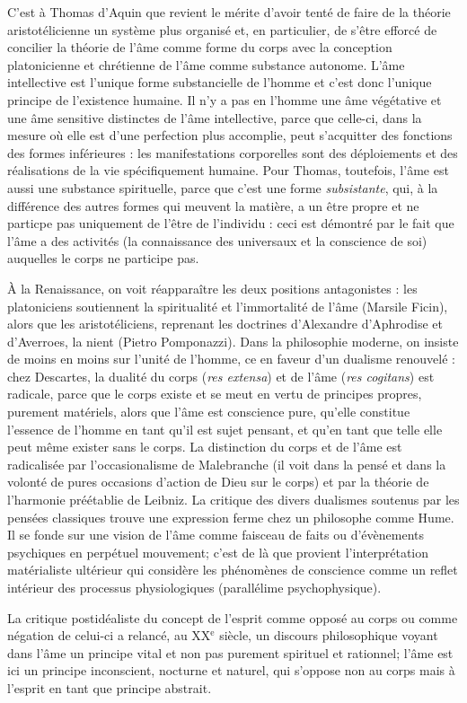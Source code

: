 C'est à Thomas d'Aquin que revient le mérite d'avoir tenté de faire de la théorie aristotélicienne un système plus organisé et, en particulier, de s'être efforcé de concilier la théorie de l'âme comme forme du corps avec la conception platonicienne et chrétienne de l'âme comme substance autonome. L'âme intellective est l'unique forme substancielle de l'homme et c'est donc l'unique principe de l'existence humaine. Il n'y a pas en l'homme une âme végétative et une âme sensitive distinctes de l'âme intellective, parce que celle-ci, dans la mesure où elle est d'une perfection plus accomplie, peut s'acquitter des fonctions des formes inférieures : les manifestations corporelles sont des déploiements et des réalisations de la vie spécifiquement humaine. Pour Thomas, toutefois, l'âme est aussi une substance spirituelle, parce que c'est une forme  {\it subsistante}, qui, à la différence des autres formes qui meuvent la matière, a un être propre et ne particpe pas uniquement de l'être de l'individu : ceci est démontré par le fait que l'âme a des activités (la connaissance des universaux et la conscience de soi) auquelles le corps ne participe pas.

À la Renaissance, on voit réapparaître les deux positions antagonistes : les platoniciens soutiennent la spiritualité et l'immortalité de l'âme (Marsile Ficin), alors que les aristotéliciens, reprenant les doctrines d'Alexandre d'Aphrodise et d'Averroes, la nient (Pietro Pomponazzi). Dans la philosophie moderne, on insiste de moins en moins sur l'unité de l'homme, ce en faveur d'un dualisme renouvelé : chez Descartes, la dualité du corps ({\it res extensa}) et de l'âme ({\it res cogitans}) est radicale, parce que le corps existe et se meut en vertu de principes propres, purement matériels, alors que l'âme est conscience pure, qu'elle constitue l'essence de l'homme en tant qu'il est sujet pensant, et qu'en tant que telle elle peut même exister sans le corps. La distinction du corps et de l'âme est radicalisée par l'occasionalisme de Malebranche (il voit dans la pensé et dans la volonté de pures occasions d'action de Dieu sur le corps) et par la théorie de l'harmonie préétablie de Leibniz. La critique des divers dualismes soutenus par les pensées classiques trouve une expression ferme chez un philosophe comme Hume. Il se fonde sur une vision de l'âme comme faisceau de faits ou d'évènements psychiques en perpétuel mouvement; c'est de là que provient l'interprétation matérialiste ultérieur qui considère les phénomènes de conscience comme un reflet intérieur des processus physiologiques (parallélime psychophysique).

La critique postidéaliste du concept de l'esprit comme opposé au corps ou comme négation de celui-ci a relancé, au {\footnotesize XX}$^{\text{e}}$ siècle, un discours philosophique voyant dans l'âme un principe vital et non pas purement spirituel et rationnel; l'âme est ici un principe inconscient, nocturne et naturel, qui s'oppose non au corps mais à l'esprit en tant que principe abstrait.


